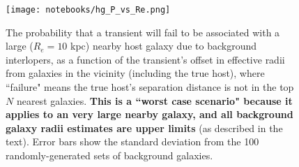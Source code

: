 \documentclass[DM,lsstdraft,authoryear,toc]{lsstdoc}
\begin{document}
\begin{figure}[h]
\begin{center}
\texttt{[image: notebooks/hg\_P\_vs\_Re.png]}
\caption{The probability that a transient will fail to be associated with a large ($R_e=10$ kpc) nearby host galaxy due to background interlopers, as a function of the transient's offset in effective radii from galaxies in the vicinity (including the true host), where ``failure" means the true host's separation distance is not in the top $N$ nearest galaxies. \textbf{This is a ``worst case scenario" because it applies to an very large nearby galaxy, and all background galaxy radii estimates are upper limits} (as described in the text). Error bars show the standard deviation from the 100 randomly-generated sets of background galaxies. \label{fig:pfail}}
\end{center}
\end{figure}







\clearpage

\end{document}
